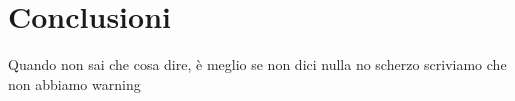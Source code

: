 \documentclass[12pt,a4paper,titlepage]{article}
\begin{document}
		\section{Conclusioni}
			Quando non sai che cosa dire, è meglio se non dici nulla
				\newline \newline \newline no scherzo scriviamo che non abbiamo warning
		
\end{document}
